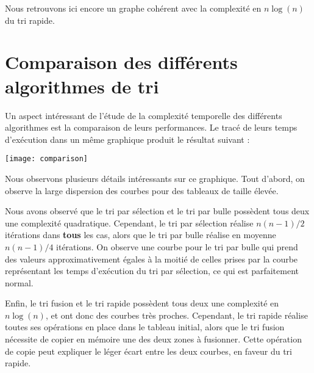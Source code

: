       Nous retrouvons ici encore un graphe cohérent avec la complexité en $n \log{} (n)$ du tri rapide.

    \section{Comparaison des différents algorithmes de tri}

      Un aspect intéressant de l'étude de la complexité temporelle des différents algorithmes est la comparaison de
      leurs performances. Le tracé de leurs temps d'exécution dans un même graphique produit le résultat suivant :

      \begin{center}
        \texttt{[image: comparison]}
      \end{center}

      Nous observons plusieurs détails intéressants sur ce graphique. Tout d'abord, on observe la large
      dispersion des courbes pour des tableaux de taille élevée.

      Nous avons observé que le tri par sélection et le tri par bulle possèdent tous deux une complexité quadratique.
      Cependant, le tri par sélection réalise $n(n-1) / 2$ itérations dans \textbf{tous} les cas, alors que le tri
       par bulle réalise en moyenne $n(n-1) / 4$ itérations. On observe une courbe pour le tri par bulle qui prend des valeurs
       approximativement égales à la moitié de celles prises par la courbe représentant les temps d'exécution du tri par
       sélection, ce qui est parfaitement normal.

       Enfin, le tri fusion et le tri rapide possèdent tous deux une complexité en $n \log{}(n)$, et ont
       donc des courbes très proches. Cependant, le tri rapide réalise toutes ses opérations en place dans le tableau initial,
       alors que le tri fusion nécessite de copier en mémoire une des deux zones à fusionner. Cette opération de copie peut
       expliquer le léger écart entre les deux courbes, en faveur du tri rapide.
